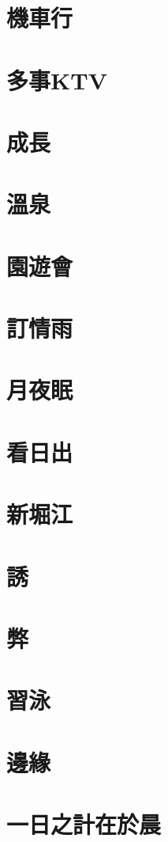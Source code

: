 \chapter{機車行}
\chapter{多事KTV}
\chapter{成長}
\chapter{溫泉}
\chapter{園遊會}
\chapter{訂情雨}
\chapter{月夜眠}
\chapter{看日出}
\chapter{新堀江}
\chapter{誘}
\chapter{弊}
\chapter{習泳}
\chapter{邊緣}
\chapter{一日之計在於晨}
